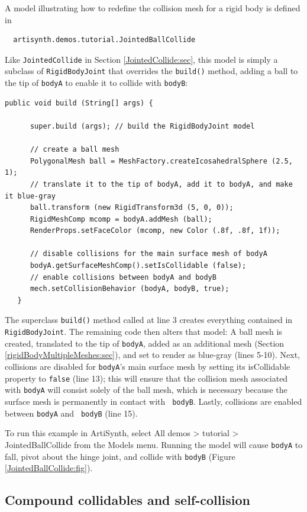A model illustrating how to redefine the collision mesh for a rigid
body is defined in
%
\begin{verbatim}
  artisynth.demos.tutorial.JointedBallCollide
\end{verbatim}
%
Like {\tt JointedCollide} in Section \ref{JointedCollide:sec}, this
model is simply a subclass of {\tt RigidBodyJoint} that overrides the
{\tt build()} method, adding a ball to the tip of {\tt bodyA} to
enable it to collide with {\tt bodyB}:
%
\lstset{numbers=left}
\begin{lstlisting}[]
   public void build (String[] args) {

      super.build (args); // build the RigidBodyJoint model

      // create a ball mesh
      PolygonalMesh ball = MeshFactory.createIcosahedralSphere (2.5, 1);
      // translate it to the tip of bodyA, add it to bodyA, and make it blue-gray
      ball.transform (new RigidTransform3d (5, 0, 0));
      RigidMeshComp mcomp = bodyA.addMesh (ball);
      RenderProps.setFaceColor (mcomp, new Color (.8f, .8f, 1f));

      // disable collisions for the main surface mesh of bodyA
      bodyA.getSurfaceMeshComp().setIsCollidable (false);
      // enable collisions between bodyA and bodyB
      mech.setCollisionBehavior (bodyA, bodyB, true);
   }
\end{lstlisting}
\lstset{numbers=none}

The superclass {\tt build()} method called at line 3 creates
everything contained in {\tt RigidBodyJoint}. The remaining code then
alters that model: A ball mesh is created, translated to the tip of
{\tt bodyA}, added as an additional mesh (Section
\ref{rigidBodyMultipleMeshes:sec}), and set to render as blue-gray
(lines 5-10). Next, collisions are disabled for {\tt bodyA}'s main
surface mesh by setting its {\sf isCollidable} property to {\tt false}
(line 13); this will ensure that the collision mesh associated with
{\tt bodyA} will consist solely of the ball mesh, which is necessary
because the surface mesh is permanently in contact with {\tt
bodyB}. Lastly, collisions are enabled between {\tt bodyA} and {\tt
bodyB} (line 15).

To run this example in ArtiSynth, select {\sf All demos > tutorial >
JointedBallCollide} from the {\sf Models} menu. Running the model will
cause {\tt bodyA} to fall, pivot about the hinge joint, and collide
with {\tt bodyB} (Figure \ref{JointedBallCollide:fig}).

\subsection{Compound collidables and self-collision}
\label{CompoundCollidablesAndSelf:sec}

